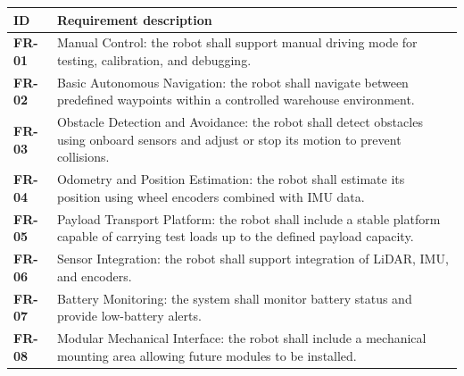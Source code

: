 \begin{table}[H]
\centering
\begin{tabularx}{\textwidth}{>{\bfseries}L{0.14\textwidth}Y}
\toprule
ID & Requirement description \\
\midrule
FR-01 & Manual Control: the robot shall support manual driving mode for testing, calibration, and debugging. \\
FR-02 & Basic Autonomous Navigation: the robot shall navigate between predefined waypoints within a controlled warehouse environment. \\
FR-03 & Obstacle Detection and Avoidance: the robot shall detect obstacles using onboard sensors and adjust or stop its motion to prevent collisions. \\
FR-04 & Odometry and Position Estimation: the robot shall estimate its position using wheel encoders combined with IMU data. \\
FR-05 & Payload Transport Platform: the robot shall include a stable platform capable of carrying test loads up to the defined payload capacity. \\
FR-06 & Sensor Integration: the robot shall support integration of LiDAR, IMU, and encoders. \\
FR-07 & Battery Monitoring: the system shall monitor battery status and provide low-battery alerts. \\
FR-08 & Modular Mechanical Interface: the robot shall include a mechanical mounting area allowing future modules to be installed. \\
\bottomrule
\end{tabularx}
\end{table}
